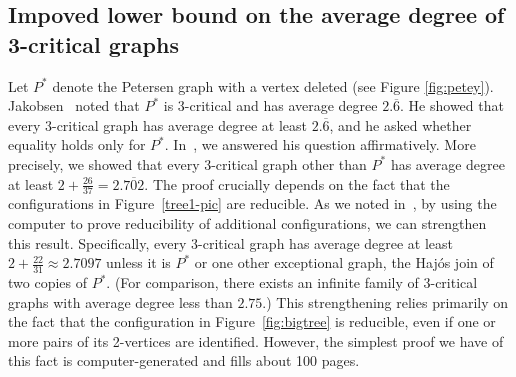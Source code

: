 \documentclass[12pt]{article}
\theoremstyle{plain}
\theoremstyle{definition}
\theoremstyle{remark}
\begin{document}
\subsection{Impoved lower bound on the average degree of 3-critical graphs}
Let $P^*$ denote the Petersen graph with a vertex deleted (see Figure \ref{fig:petey}).
Jakobsen~\cite{Jakobsen73,Jakobsen74} noted that $P^*$ is 3-critical and has
average degree $2.\overline{6}$.  He showed that every 3-critical graph has average
degree at least $2.\overline{6}$, and he asked whether equality holds only for $P^*$.
In~\cite{3criticalCR}, we answered his question affirmatively.  More precisely,
we showed that every 3-critical graph other than $P^*$ has average degree at
least $2+\frac{26}{37}=2.\overline{702}$.  The proof crucially depends on the
fact that the configurations in Figure~\ref{tree1-pic} are reducible.
As we noted in~\cite{3criticalCR}, by using the computer to prove reducibility
of additional configurations, we can strengthen this result.  Specifically,
every 3-critical graph has average degree at least $2+\frac{22}{31} \approx
2.7097$ unless it is $P^*$ or one other exceptional graph, the Haj\'{o}s
join of two copies of $P^*$.  (For comparison, there exists an infinite family of
3-critical graphs with average degree less than $2.75$.)  This strengthening
relies primarily on the fact that the configuration in
Figure~\ref{fig:bigtree} is reducible, even if one or more pairs of
its 2-vertices are identified.  However, the simplest proof we have of this fact
is computer-generated and fills about 100 pages.
\end{document}
